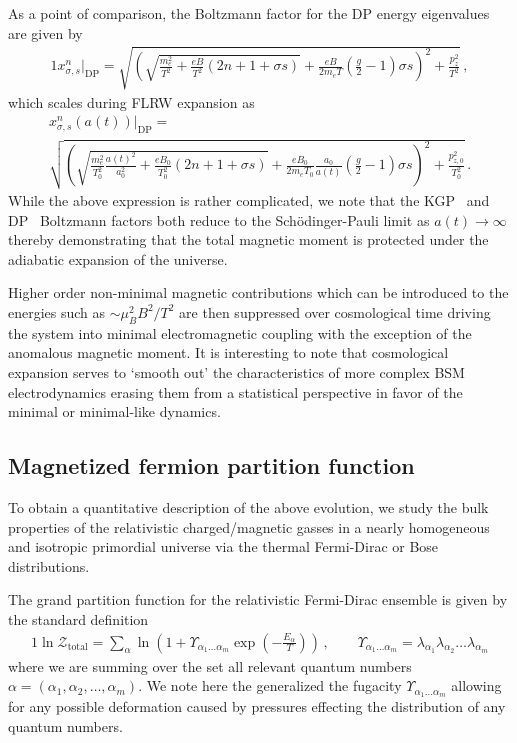 As a point of comparison, the Boltzmann factor for the DP energy eigenvalues are given by
\begin{alignat}{1}
    \label{xscaledp:1} x_{\sigma,s}^{n}\vert_\mathrm{DP} = \sqrt{\left(\sqrt{\frac{m_{e}^{2}}{T^{2}}+\frac{eB}{T^{2}}\left(2n+1+\sigma s\right)}+\frac{eB}{2m_{e}T}\left(\frac{g}{2}-1\right)\sigma s\right)^{2}+\frac{p_{z}^{2}}{T^{2}}}\,,
\end{alignat}
which scales during FLRW expansion as
\begin{multline}
    \label{xscaledp:2} x_{\sigma,s}^{n}(a(t))\vert_\mathrm{DP} =\\ \sqrt{\left(\sqrt{\frac{m_{e}^{2}}{T_{0}^{2}}\frac{a(t)^{2}}{a_{0}^{2}}+\frac{eB_{0}}{T_{0}^{2}}\left(2n+1+\sigma s\right)}+\frac{eB_{0}}{2m_{e}T_{0}}\frac{a_{0}}{a(t)}\left(\frac{g}{2}-1\right)\sigma s\right)^{2}+\frac{p_{z,0}^{2}}{T_{0}^{2}}}\,.
\end{multline}
While the above expression is rather complicated, we note that the KGP~ and DP~ Boltzmann factors both reduce to the Sch{\"o}dinger-Pauli limit as $a(t)\rightarrow\infty$ thereby demonstrating that the total magnetic moment is protected under the adiabatic expansion of the universe.

Higher order non-minimal magnetic contributions which can be introduced to the energies such as $\sim\mu_{B}^{2}B^{2}/T^{2}$ are then suppressed over cosmological time driving the system into minimal electromagnetic coupling with the exception of the anomalous magnetic moment. It is interesting to note that cosmological expansion serves to `smooth out' the characteristics of more complex BSM electrodynamics erasing them from a statistical perspective in favor of the minimal or minimal-like dynamics.

\subsection{Magnetized fermion partition function}
\label{sec:partition}
\noindent To obtain a quantitative description of the above evolution, we study the bulk properties of the relativistic charged/magnetic gasses in a nearly homogeneous and isotropic primordial universe via the thermal Fermi-Dirac or Bose distributions.

The grand partition function for the relativistic Fermi-Dirac ensemble is given by the standard definition
\begin{alignat}{1}
    \label{part:1} \ln\mathcal{Z}_\mathrm{total}=\sum_{\alpha}\ln\left(1+\Upsilon_{\alpha_{1}\ldots\alpha_{m}}\exp\left(-\frac{E_{\alpha}}{T}\right)\right)\,,\qquad\Upsilon_{\alpha_{1}\ldots\alpha_{m}}=\lambda_{\alpha_{1}}\lambda_{\alpha_{2}}\ldots\lambda_{\alpha_{m}}
\end{alignat}
where we are summing over the set all relevant quantum numbers $\alpha=(\alpha_{1},\alpha_{2},\ldots,\alpha_{m})$. We note here the generalized the fugacity $\Upsilon_{\alpha_{1}\ldots\alpha_{m}}$ allowing for any possible deformation caused by pressures effecting the distribution of any quantum numbers.


